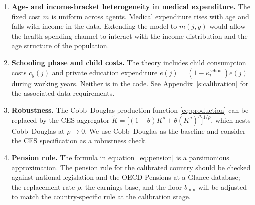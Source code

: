 \begin{enumerate}
    \item \textbf{Age- and income-bracket heterogeneity in medical expenditure.} The fixed cost $m$ is uniform across agents. Medical expenditure rises with age and falls with income in the data. Extending the model to $m(j, y)$ would allow the health spending channel to interact with the income distribution and the age structure of the population.
    \item \textbf{Schooling phase and child costs.} The theory includes child consumption costs $c_y(j)$ and private education expenditure $e(j) = (1-\kappa^{\text{school}}_t)\bar{e}(j)$ during working years. Neither is in the code. See Appendix~\ref{s:calibration} for the associated data requirements.
    \item \textbf{Robustness.} The Cobb--Douglas production function \eqref{eq:production} can be replaced by the CES aggregator $\tilde{K} = \bigl[(1-\theta)K^\rho + \theta(K^g)^\rho\bigr]^{1/\rho}$, which nests Cobb--Douglas at $\rho \to 0$. We use Cobb--Douglas as the baseline and consider the CES specification as a robustness check.
    \item \textbf{Pension rule.} The formula in equation~\eqref{eq:pension} is a parsimonious approximation. The pension rule for the calibrated country should be checked against national legislation and the OECD Pensions at a Glance database; the replacement rate $\rho$, the earnings base, and the floor $b_{\min}$ will be adjusted to match the country-specific rule at the calibration stage.
\end{enumerate}




